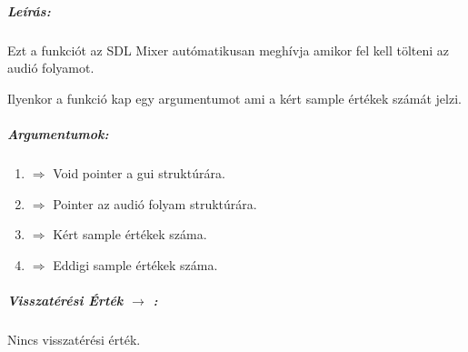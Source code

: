 \documentclass{article}
\begin{document}
\subparagraph{Leírás:}
Ezt a funkciót az SDL Mixer autómatikusan meghívja amikor
fel kell tölteni az audió folyamot.

Ilyenkor a funkció kap egy  argumentumot
ami a kért sample értékek számát jelzi.

\subparagraph{Argumentumok:}
\begin{enumerate}
    \item {} \(\Rightarrow\) Void pointer a gui struktúrára.
    \item {} \(\Rightarrow\) Pointer az
        audió folyam struktúrára.
    \item {} \(\Rightarrow\) Kért sample értékek
        száma.
    \item {} \(\Rightarrow\) Eddigi sample értékek
        száma.
\end{enumerate}

\subparagraph{Visszatérési Érték \(\rightarrow\) :}
Nincs visszatérési érték.
\chline
\end{document}
